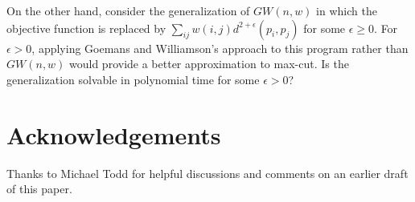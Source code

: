 \documentclass[11pt]{article}
\begin{document}
On the other hand, consider the generalization of $GW(n,w)$
in which the objective function is replaced by
$\sum_{ij} w(i,j) d^{2+\epsilon}(p_i,p_j)$ for some $\epsilon \ge 0$.
For $\epsilon > 0$, 
applying Goemans and Williamson's approach 
to this program rather than $GW(n,w)$
would provide a better approximation to max-cut.
Is the generalization solvable in polynomial time for some $\epsilon > 0$?

\section{Acknowledgements}
Thanks to Michael Todd for helpful discussions 
and comments on an earlier draft of this paper.



\end{document}
